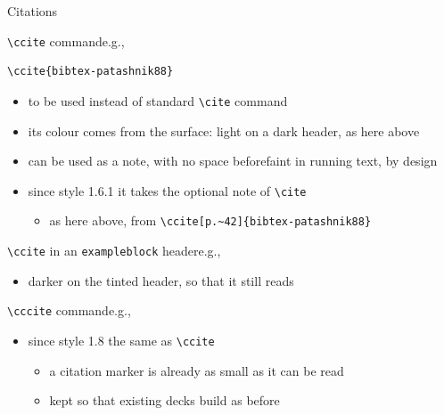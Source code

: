 \documentclass[presentation,bologna,apice]{beamer}\mode<presentation>{\usetheme{AMSUniBo}}
\begin{document}
\begin{frame}{Citations}
%
\begin{block}{\texttt{\textbackslash{}ccite} command\textemdash{}e.g., }
\begin{verbatim}
\ccite{bibtex-patashnik88}
\end{verbatim}
\begin{itemize}
	\item to be used instead of standard \texttt{\textbackslash{}cite} command
	\item its colour comes from the surface: light on a dark header, as here above
	\item can be used as a note, with no space before\textemdash{}faint in running text, by design
	\item since style 1.6.1 it takes the optional note of \texttt{\textbackslash{}cite}
	\begin{itemize}
		\item as here above, from \verb|\ccite[p.~42]{bibtex-patashnik88}|
	\end{itemize}
\end{itemize}
\end{block}
%
\begin{exampleblock}{\texttt{\textbackslash{}ccite} in an \texttt{exampleblock} header\textemdash{}e.g., }
\begin{itemize}
	\item darker on the tinted header, so that it still reads
\end{itemize}
\end{exampleblock}
%
\begin{alertblock}{\texttt{\textbackslash{}cccite} command\textemdash{}e.g., }
\begin{itemize}
	\item since style 1.8 the same as \texttt{\textbackslash{}ccite}
	\begin{itemize}
		\item a citation marker is already as small as it can be read
		\item kept so that existing decks build as before
	\end{itemize}
\end{itemize}
\end{alertblock}
%
\end{frame}
\end{document}
